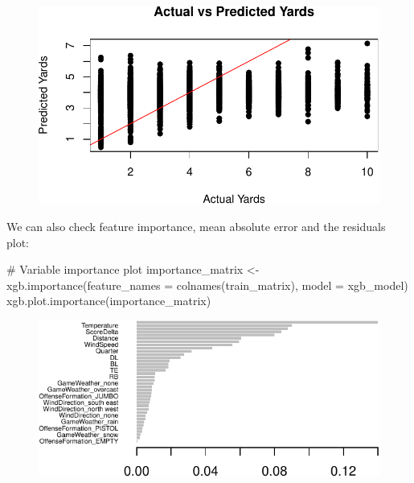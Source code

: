 \documentclass[
  super,
  preprint,
  3p]{elsarticle}
\newenvironment{Shaded}{\begin{snugshade}}{\end{snugshade}}
\newcommand{\AttributeTok}[1]{\textcolor[rgb]{0.40,0.45,0.13}{#1}}
\newcommand{\CommentTok}[1]{\textcolor[rgb]{0.37,0.37,0.37}{#1}}
\newcommand{\FunctionTok}[1]{\textcolor[rgb]{0.28,0.35,0.67}{#1}}
\newcommand{\NormalTok}[1]{\textcolor[rgb]{0.00,0.23,0.31}{#1}}
\newcommand{\OtherTok}[1]{\textcolor[rgb]{0.00,0.23,0.31}{#1}}
\begin{document}
\begin{figure}[H]

{\centering \includegraphics{project_report_files/figure-pdf/unnamed-chunk-55-1.pdf}

}

\end{figure}

We can also check feature importance, mean absolute error and the
residuals plot:

\begin{Shaded}
\begin{Highlighting}[]
\CommentTok{\# Variable importance plot}
\NormalTok{importance\_matrix }\OtherTok{\textless{}{-}} \FunctionTok{xgb.importance}\NormalTok{(}\AttributeTok{feature\_names =} \FunctionTok{colnames}\NormalTok{(train\_matrix), }\AttributeTok{model =}\NormalTok{ xgb\_model)}
\FunctionTok{xgb.plot.importance}\NormalTok{(importance\_matrix)}
\end{Highlighting}
\end{Shaded}

\begin{figure}[H]

{\centering \includegraphics{project_report_files/figure-pdf/unnamed-chunk-56-1.pdf}

}

\end{figure}
\end{document}

